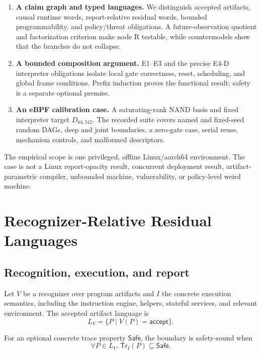 \documentclass[conference]{IEEEtran}
\begin{document}
\begin{enumerate}
\item \textbf{A claim graph and typed languages.} We distinguish accepted artifacts, causal runtime words, report-relative residual words, bounded programmability, and policy/threat obligations. A future-observation quotient and factorization criterion make node R testable, while countermodels show that the branches do not collapse.

\item \textbf{A bounded composition argument.} E1--E3 and the precise E4-D interpreter obligations isolate local gate correctness, reset, scheduling, and global frame conditions. Prefix induction proves the functional result; safety is a separate optional premise.

\item \textbf{An eBPF calibration case.} A saturating-rank NAND basis and fixed interpreter target $D_{64,512}$. The recorded suite covers named and fixed-seed random DAGs, deep and joint boundaries, a zero-gate case, serial reuse, mechanism controls, and malformed descriptors.
\end{enumerate}

The empirical scope is one privileged, offline Linux/aarch64 environment. The case is not a Linux report-opacity result, concurrent deployment result, artifact-parametric compiler, unbounded machine, vulnerability, or policy-level weird machine.

\section{Recognizer-Relative Residual Languages}

\subsection{Recognition, execution, and report}

Let $V$ be a recognizer over program artifacts and $I$ the concrete execution semantics, including the instruction engine, helpers, stateful services, and relevant environment. The accepted artifact language is
\begin{equation}
L_V = \{P \mid V(P)=\mathsf{accept}\}.
\end{equation}

For an optional concrete trace property $\mathsf{Safe}$, the boundary is safety-sound when
\begin{equation}
\forall P\in L_V.\ \mathsf{Tr}_I(P)\subseteq\mathsf{Safe}.
\end{equation}
\end{document}
